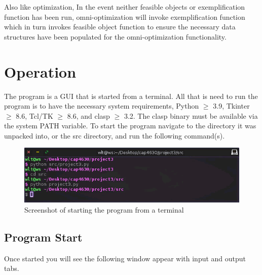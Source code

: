 \documentclass[12pt]{report}
\begin{document}
Also like optimization, In the event neither feasible objects or exemplification function has been run, omni-optimization will invoke exemplification function which in turn invokes feasible object function to ensure the necessary data structures have been populated for the omni-optimization functionality. 

\newpage
\section{Operation}
The program is a GUI that is started from a terminal. All that is need to run the program is to have the necessary system requirements, Python $\geq$ 3.9, Tkinter $\geq$ 8.6, Tcl/TK $\geq$ 8.6, and clasp $\geq$ 3.2. The clasp binary must be available via the system PATH variable. To start the program navigate to the directory it was unpacked into, or the src directory, and run the following command(s).

\begin{figure}[H]
\begin{center}
\includegraphics[scale=0.5]{start_program}
\caption{Screenshot of starting the program from a terminal}
\end{center}
\end{figure}

\subsection{Program Start}
Once started you will see the following window appear with input and output tabs.
\end{document}
